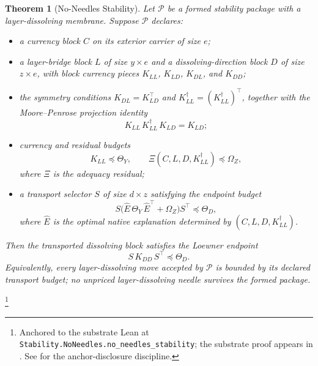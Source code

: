 \documentclass[11pt]{article}
\newtheorem{theorem}{Theorem}[section]
\theoremstyle{definition}
\begin{document}
\begin{theorem}[No-Needles Stability]\label{thm:F6}
Let \(\mathcal P\) be a formed stability package with a
layer-dissolving membrane.  Suppose \(\mathcal P\) declares:
\begin{itemize}
  \item a currency block \(C\) on its exterior carrier of size \(e\);
  \item a layer-bridge block \(L\) of size \(y\times e\) and a
  dissolving-direction block \(D\) of size \(z\times e\), with block
  currency pieces \(K_{LL}\), \(K_{LD}\), \(K_{DL}\), and \(K_{DD}\);
  \item the symmetry conditions \(K_{DL}=K_{LD}^{\!\top}\) and
  \(K_{LL}^{\dagger}=(K_{LL}^{\dagger})^{\!\top}\), together with the
  Moore--Penrose projection identity
  \[
    K_{LL}\,K_{LL}^{\dagger}\,K_{LD}=K_{LD};
  \]
  \item currency and residual budgets
  \[
    K_{LL}\preceq \Theta_Y,
    \qquad
    \Xi(C,L,D,K_{LL}^{\dagger})\preceq \Omega_Z,
  \]
  where \(\Xi\) is the adequacy residual;
  \item a transport selector \(S\) of size \(d\times z\) satisfying
  the endpoint budget
  \[
    S\bigl(\widehat E\,\Theta_Y\,\widehat E^{\!\top}
      +\Omega_Z\bigr)S^{\!\top}\preceq\Theta_D,
  \]
  where \(\widehat E\) is the optimal native explanation determined
  by \((C,L,D,K_{LL}^{\dagger})\).
\end{itemize}
Then the transported dissolving block satisfies the Loewner endpoint
\[
  S\,K_{DD}\,S^{\!\top}\preceq\Theta_D .
\]
Equivalently, every layer-dissolving move accepted by \(\mathcal P\)
is bounded by its declared transport budget; no unpriced
layer-dissolving needle survives the formed package.
\end{theorem}
\footnote{Anchored to the substrate Lean at
\texttt{Stability.NoNeedles.\allowbreak{}no\_needles\_stability};
the substrate proof appears in
\citep{Tsiokos2026NeedleKiller, Tsiokos2026NavierStokes}.  See
 for the anchor-disclosure discipline.}
\end{document}
